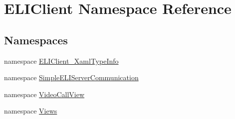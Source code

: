 \hypertarget{namespace_e_l_i_client}{}\section{E\+L\+I\+Client Namespace Reference}
\label{namespace_e_l_i_client}
\subsection*{Namespaces}
\begin{DoxyCompactItemize}
\item 
namespace \hyperlink{namespace_e_l_i_client_1_1_e_l_i_client___xaml_type_info}{E\+L\+I\+Client\+\_\+\+Xaml\+Type\+Info}
\item 
namespace \hyperlink{namespace_e_l_i_client_1_1_simple_e_l_i_server_communication}{Simple\+E\+L\+I\+Server\+Communication}
\item 
namespace \hyperlink{namespace_e_l_i_client_1_1_video_call_view}{Video\+Call\+View}
\item 
namespace \hyperlink{namespace_e_l_i_client_1_1_views}{Views}
\end{DoxyCompactItemize}
